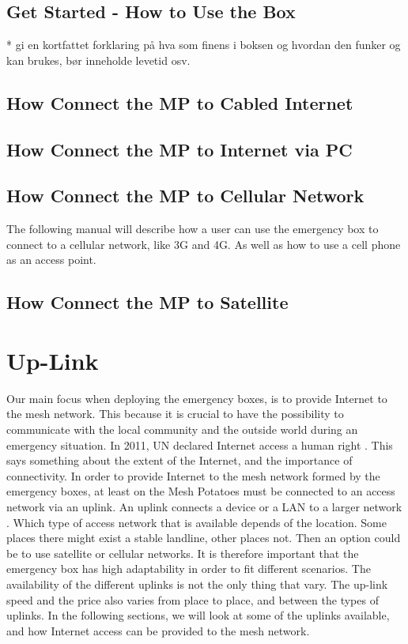 \subsection{Get Started - How to Use the Box}
* gi en kortfattet forklaring på hva som finens i boksen og hvordan den funker og kan brukes, bør inneholde levetid osv.


\subsection{How Connect the MP to Cabled Internet}


\subsection{How Connect the MP to Internet via PC}


\subsection{How Connect the MP to Cellular Network}
The following manual will describe how a user can use the emergency box to connect to a cellular network, like 3G and 4G. As well as how to use a cell phone as an access point. 



\subsection{How Connect the MP to Satellite}



\section{Up-Link}
Our main focus when deploying the emergency boxes, is to provide Internet to the mesh network. This because it is crucial to have the possibility to communicate with the local community and the outside world during an emergency situation. In 2011, UN declared Internet access a human right \cite{HR}. This says something about the extent of the Internet, and the importance of connectivity. In order to provide Internet to the mesh network formed by the emergency boxes, at least on the Mesh Potatoes must be connected to an access network via an uplink. An uplink connects a device or a LAN to a larger network \cite{uplink}. Which type of access network that is available depends of the location. Some places there might exist a stable landline, other places not. Then an option could be to use satellite or cellular networks. It is therefore important that the emergency box has high adaptability in order to fit different scenarios. The availability of the different uplinks is not the only thing that vary. The up-link speed and the price also varies from place to place, and between the types of uplinks. In the following sections, we will look at some of the uplinks available, and how Internet access can be provided to the mesh network.  

